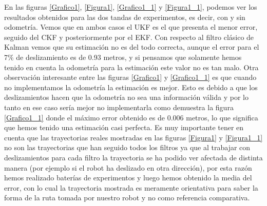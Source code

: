 En las figuras \ref{Grafico1}, \ref{Figura1}, \ref{Grafico1_1} y \ref{Figura1_1}, podemos ver los resultados obtenidos para las dos tandas de experimentos, es decir, con y sin odometría.
Vemos que en ambos casos el \ac{UKF} es el que presenta el menor error, seguido del \ac{CKF} y posteriormente por el \ac{EKF}.
Con respecto al filtro clásico de Kalman vemos que su estimación no es del todo correcta, aunque el error para el 7\% de deslizamiento es de 0.93 metros, y si pensamos que solamente hemos tenido en cuenta la odometría para la estimación este valor no es tan malo.
Otra observación interesante entre las figuras \ref{Grafico1} y \ref{Grafico1_1} es que cuando no implementamos la odometría la estimación es mejor.
Esto es debido a que los deslizamientos hacen que la odometría no sea una información válida y por lo tanto en ese caso sería mejor no implementarla como demuestra la figura \ref{Grafico1_1} donde el máximo error obtenido es de 0.006 metros, lo que significa que hemos tenido una estimación casi perfecta.
%
%
%
%
%
Es muy importante tener en cuenta que las trayectorias reales mostradas en las figuras \ref{Figura1} y \ref{Figura1_1} no son las trayectorias que han seguido todos los filtros ya que al trabajar con deslizamientos para cada filtro la trayectoria se ha podido ver afectada de distinta manera (por ejemplo si el robot ha deslizado en otra dirección), por esta razón hemos realizado baterías de experimentos y luego hemos obtenido la media del error, con lo cual la trayectoria mostrada es meramente orientativa para saber la forma de la ruta tomada por nuestro robot y no como referencia comparativa.
%
%
%
%
%
